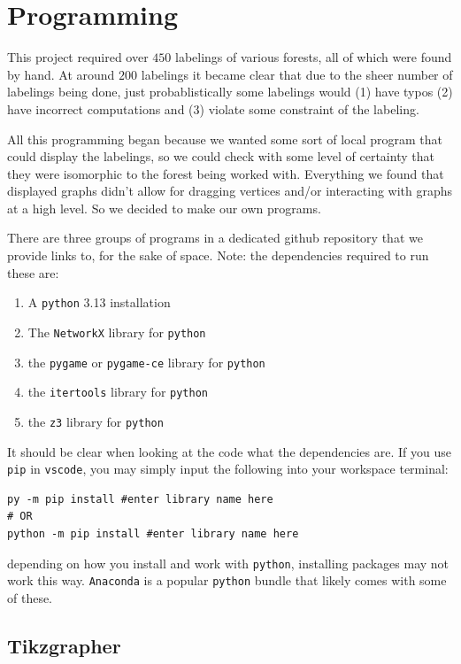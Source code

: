 \chapter{Programming}\label{chap:programming}
This project required over $450$ labelings of various forests, all of which were found by hand. At around $200$ labelings it became clear that due to the sheer number of labelings being done, just probablistically some labelings would (1) have typos (2) have incorrect computations and (3) violate some constraint of the labeling.

All this programming began because we wanted some sort of local program that could display the labelings, so we could check with some level of certainty that they were isomorphic to the forest being worked with. Everything we found that displayed graphs didn't allow for dragging vertices and/or interacting with graphs at a high level. So we decided to make our own programs.

There are three groups of programs in a dedicated github repository that we provide links to, for the sake of space. Note: the dependencies required to run these are:

\begin{enumerate}
  \item A \verb|python| 3.13 installation
  \item The \verb|NetworkX| library for \verb|python|
  \item the \verb|pygame| or \verb|pygame-ce| library for \verb|python|
  \item the \verb|itertools| library for \verb|python|
  \item the \verb|z3| library for \verb|python|
\end{enumerate}
It should be clear when looking at the code what the dependencies are. If you use \verb|pip| in \verb|vscode|, you may simply input the following into your workspace terminal: 
\begin{verbatim}
py -m pip install #enter library name here
# OR
python -m pip install #enter library name here
\end{verbatim}
depending on how you install and work with \verb|python|, installing packages may not work this way. \verb|Anaconda| is a popular \verb|python| bundle that likely comes with some of these.

\section{Tikzgrapher}

